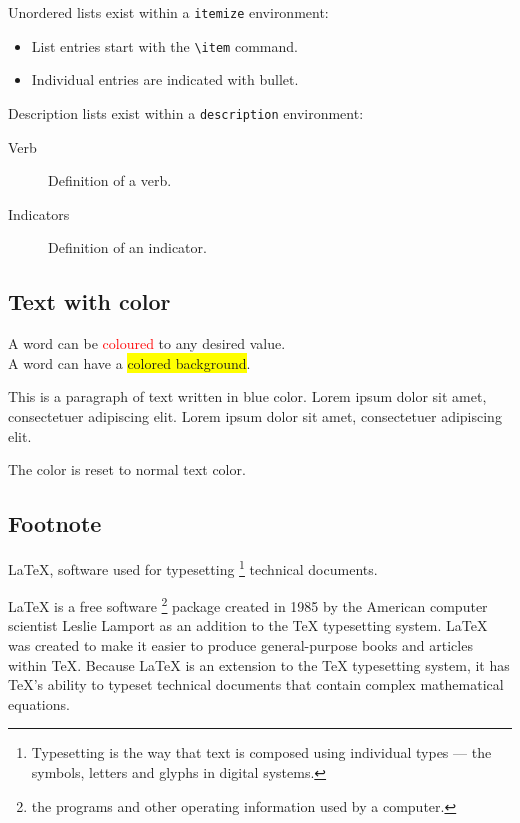 Unordered lists exist within a \verb|itemize| environment:
\begin{itemize}
  \item List entries start with the \verb|\item| command.
  \item Individual entries are indicated with bullet.
\end{itemize}

Description lists exist within a \verb|description| environment:
\begin{description}
    \item[Verb] Definition of a verb.
    \item[Indicators] Definition of an indicator.
\end{description}

\subsection{Text with color}
\label{sec:textcolor}

A word can be \textcolor{red}{coloured} to any desired value.\\
A word can have a \colorbox{yellow}{colored background}.
\par
{\color{blue}
This is a paragraph of text written in blue color. Lorem ipsum dolor 
sit amet, consectetuer adipiscing elit. Lorem ipsum dolor sit amet, 
consectetuer adipiscing elit. 
}
\par
The color is reset to normal text color.

\subsection{Footnote}

LaTeX, software used for typesetting \footnote{Typesetting is the way 
that text is composed using individual types — the symbols, letters and
glyphs in digital systems.} technical documents.
\par
LaTeX is a free software \footnote{the programs and other operating 
information used by a computer.} package created in 1985 by the American computer 
scientist Leslie Lamport as an addition to the TeX typesetting system. 
LaTeX was created to make it easier to produce general-purpose books and 
articles within TeX. Because LaTeX is an extension to the TeX typesetting 
system, it has TeX’s ability to typeset technical documents that contain 
complex mathematical equations.

